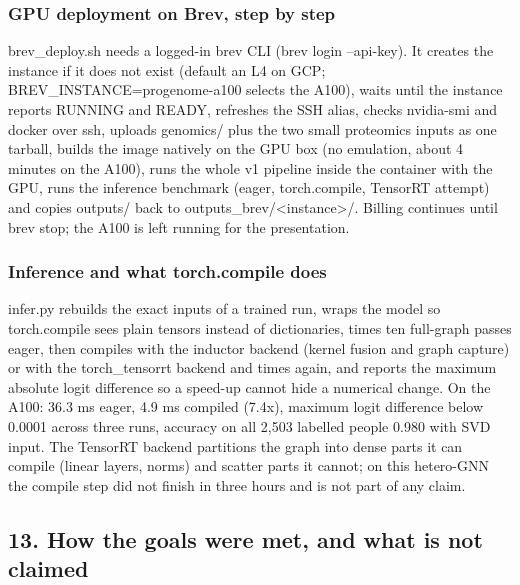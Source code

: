 \documentclass[11pt,a4paper]{article}
\begin{document}
\subsubsection{GPU deployment on Brev, step by step}

brev\_deploy.sh needs a logged-in brev CLI (brev login --api-key). It creates the instance if it does not exist (default an L4 on GCP; BREV\_INSTANCE=progenome-a100 selects the A100), waits until the instance reports RUNNING and READY, refreshes the SSH alias, checks nvidia-smi and docker over ssh, uploads genomics/ plus the two small proteomics inputs as one tarball, builds the image natively on the GPU box (no emulation, about 4 minutes on the A100), runs the whole v1 pipeline inside the container with the GPU, runs the inference benchmark (eager, torch.compile, TensorRT attempt) and copies outputs/ back to outputs\_brev/<instance>/. Billing continues until brev stop; the A100 is left running for the presentation.

\subsubsection{Inference and what torch.compile does}

infer.py rebuilds the exact inputs of a trained run, wraps the model so torch.compile sees plain tensors instead of dictionaries, times ten full-graph passes eager, then compiles with the inductor backend (kernel fusion and graph capture) or with the torch\_tensorrt backend and times again, and reports the maximum absolute logit difference so a speed-up cannot hide a numerical change. On the A100: 36.3 ms eager, 4.9 ms compiled (7.4x), maximum logit difference below 0.0001 across three runs, accuracy on all 2,503 labelled people 0.980 with SVD input. The TensorRT backend partitions the graph into dense parts it can compile (linear layers, norms) and scatter parts it cannot; on this hetero-GNN the compile step did not finish in three hours and is not part of any claim.

\subsection{13. How the goals were met, and what is not claimed}
\end{document}

